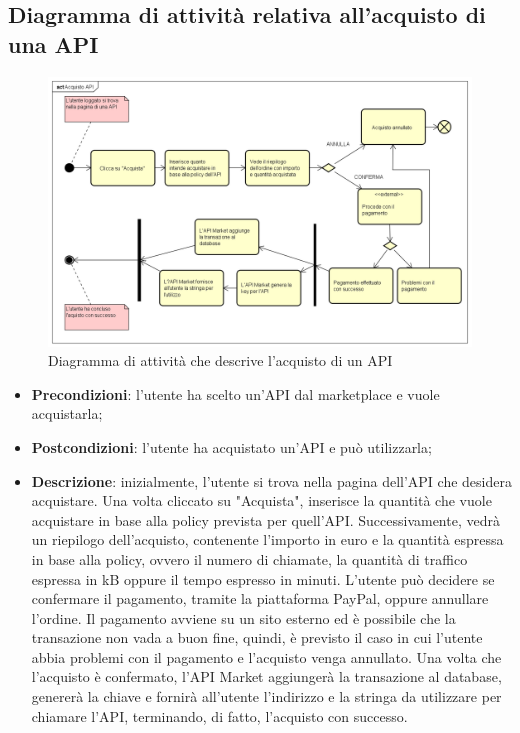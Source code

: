\newpage
\subsection{Diagramma di attività relativa all'acquisto di una API}
\begin{figure}[h]
	\centering
	\includegraphics[width=1.0\linewidth]{IMG/Acquisto_API}
	\caption{Diagramma di attività che descrive l'acquisto di un API}
	\label{fig:acquistoapi}
\end{figure}

\begin{itemize}
	\item \textbf{Precondizioni}: l'utente ha scelto un'API dal marketplace e vuole acquistarla;
	\item \textbf{Postcondizioni}: l'utente ha acquistato un'API e può utilizzarla;
	\item \textbf{Descrizione}: inizialmente, l'utente si trova nella pagina dell'API che desidera acquistare. Una volta cliccato su "Acquista", inserisce la quantità che vuole acquistare in base alla policy prevista per quell'API. Successivamente, vedrà un riepilogo dell'acquisto, contenente l'importo in euro e la quantità espressa in base alla policy, ovvero il numero di chiamate, la quantità di traffico espressa in kB oppure il tempo espresso in minuti. L'utente può decidere se confermare il pagamento, tramite la piattaforma PayPal, oppure annullare l'ordine. Il pagamento avviene su un sito esterno ed è possibile che la transazione non vada a buon fine, quindi, è previsto il caso in cui l'utente abbia problemi con il pagamento e l'acquisto venga annullato. Una volta che l'acquisto è confermato, l'API Market aggiungerà la transazione al database, genererà la chiave e fornirà all'utente l'indirizzo e la stringa da utilizzare per chiamare l'API, terminando, di fatto, l'acquisto con successo. 
\end{itemize}

